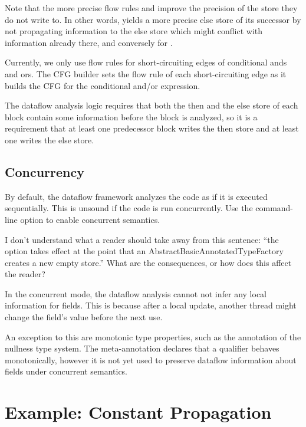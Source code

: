 Note that the more precise flow rules  and 
improve the precision of the store they do not write to.  In other words, 
yields a more precise else store of its successor by not propagating information to the else store which might conflict with information already there, and conversely for .

Currently, we only use flow rules for short-circuiting edges of conditional ands and ors.  The CFG builder sets the flow rule of each short-circuiting edge as it builds the CFG for the conditional and/or expression. 

The dataflow analysis logic requires that both the then and the else store of each block contain some information before the block is analyzed, so it is a requirement that at least one predecessor block writes the then store and at least one writes the else store.


\subsection{Concurrency}

By default, the dataflow framework analyzes the code as if it is 
executed sequentially.
This is unsound if the code is run concurrently.  Use the
command-line option to enable concurrent semantics.

\begin{workinprogress}
I don't understand what a reader should take away from this sentence:
``the option takes effect at the point that an
AbstractBasicAnnotatedTypeFactory creates a new empty store.''
What are the consequences, or how does this affect the reader?
\end{workinprogress}

In the concurrent mode, the dataflow analysis cannot not infer any local
information for fields.  This is because after a local update, another
thread might change the field's value before the next use.

An exception to this are monotonic type properties, such as the  annotation
of the nullness type system.  The meta-annotation  declares that a qualifier behaves monotonically, however it is not yet used to
preserve dataflow information about fields under concurrent semantics.


\section{Example: Constant Propagation}

